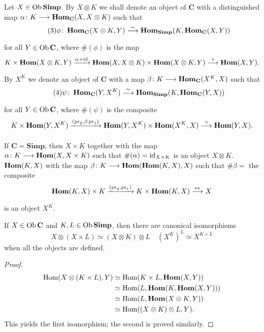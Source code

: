 \documentclass[../main]{subfiles}
\begin{document}
\begin{definition}\label{def:2.1.3}
Let $X \in \operatorname{Ob} \mathbf{Simp}$. By $X \otimes K$ we shall denote an object of $\mathbf C$ with a distinguished map $\alpha \colon K \longrightarrow \operatorname{\mathbf{Hom}}_{\mathbf C}(X, X \otimes K)$ such that 
\begin{equation}\tag{3}
\label{eq:2.1.03}
    \phi \colon \UHom_{\mathbf C} (X \otimes K, Y) \varrightarrow{\sim} \UHom_{\mathbf{Simp}}(K, \UHom_{\mathbf C}(X, Y))
\end{equation}
for all $Y \in \operatorname{Ob} \mathbf C$, where $\#(\phi)$ is the map 
\[
    K \times \UHom (X \otimes K, Y) \varrightarrow{\alpha \times \id} \UHom(X, X \otimes K) \times \UHom(X \otimes K, Y) \varrightarrow \circ \UHom(X,Y).
\]
By $X^K$ we denote an object of $\mathbf C$ with a map $\beta \colon K \longrightarrow \operatorname{\mathbf{Hom}}_{\mathbf C}(X^K, X)$ such that 
\begin{equation}\tag{4}
\label{eq:2.1.04}
    \psi \colon \UHom_{\mathbf C}(Y, X^K) \varrightarrow \sim \UHom_{\mathbf{Simp}}(K, \UHom_{\mathbf C}(Y,X))
\end{equation}
for all $Y \in \operatorname{Ob} \mathbf C$, where $\#(\psi)$ is the composite
\[
    K \times \UHom(Y, X^K) \varrightarrow{(\pr_2, \beta \pr_1)} \UHom(Y, X^K) \times \UHom(X^K, X) \varrightarrow \circ \UHom(Y,X).
\]
\end{definition}

\begin{example*}
If $\mathbf C = \mathbf{Simp}$, then $X \times K$ together with the map \\$\alpha \colon K \longrightarrow \operatorname{\mathbf{Hom}}(X, X\times K)$ such that $\#(\alpha) = \operatorname{id}_{X \times K}$ is an object $X \otimes K$. $\operatorname{\mathbf{Hom}}(K, X)$ with the map $\beta \colon K \longrightarrow \operatorname{\mathbf{Hom}}(\operatorname{\mathbf{Hom}}(K,X), X)$ such that $\#\beta = $ the composite 
\[
    \UHom(K, X) \times K \varrightarrow{(\pr_2, \pr_1)} K \times \UHom(K, X) \varrightarrow{\ev} X
\]
is an object $X^K$.
\end{example*}

\begin{proposition}
\label{prop:2.1.01}
If $X \in \operatorname{Ob} \mathbf C$ and $K, L \in \operatorname{Ob} \mathbf{Simp}$, then there are canonical isomorphisms 
\begin{equation}
\label{eq:2.1.05}\tag{5}
    X \otimes ( X \times L) \simeq (X \otimes K) \otimes L
    \quad
    (X^K)^L \simeq X^{K \times L}
\end{equation}
when all the objects are defined.
\end{proposition}
\begin{proof}
\begin{align*}
    \operatorname{Hom}(X \otimes (K \times L), Y) 
    &\simeq \operatorname{Hom}(K \times L, \operatorname{\mathbf{Hom}}(X, Y))
    \\&\simeq \operatorname{Hom}(L, \operatorname{\mathbf{Hom}}(K, \operatorname{\mathbf{Hom}}(X, Y)))
    \\&\simeq \operatorname{Hom}(L, \operatorname{\mathbf{Hom}}(X \otimes K, Y)) 
    \\&\simeq \operatorname{Hom}((X \otimes K) \otimes L, Y).
\end{align*}
This yields the first isomorphism; the second is proved similarly.
\end{proof}
\end{document}
